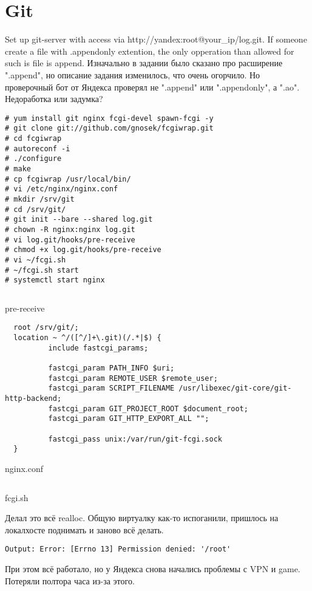 \documentclass[a4paper,10pt]{report}
\begin{document}
\chapter{Git}
Set up git-server with access via http://yandex:root@your\_ip/log.git.
\newline
If someone create a file with .appendonly extention, the only opperation than allowed for such is file is append.
\newline\newline
Изначально в задании было сказано про расширение ".append", но описание задания изменилось, что очень огорчило.
Но проверочный бот от Яндекса проверял не ".append" или ".appendonly", а ".ao". Недоработка или задумка?
\begin{verbatim}
# yum install git nginx fcgi-devel spawn-fcgi -y
# git clone git://github.com/gnosek/fcgiwrap.git
# cd fcgiwrap
# autoreconf -i
# ./configure
# make
# cp fcgiwrap /usr/local/bin/
# vi /etc/nginx/nginx.conf
# mkdir /srv/git
# cd /srv/git/
# git init --bare --shared log.git
# chown -R nginx:nginx log.git
# vi log.git/hooks/pre-receive
# chmod +x log.git/hooks/pre-receive
# vi ~/fcgi.sh
# ~/fcgi.sh start
# systemctl start nginx
\end{verbatim}
\begin{listing}[H]
  \inputminted[linenos=true, fontsize=\scriptsize, samepage=true]{bash}{pre-receive}
  \caption{pre-receive}
  \label{lst:pre-receive}

  \begin{verbatim}
  root /srv/git/;
  location ~ ^/([^/]+\.git)(/.*|$) {
          include fastcgi_params;

          fastcgi_param PATH_INFO $uri;
          fastcgi_param REMOTE_USER $remote_user;
          fastcgi_param SCRIPT_FILENAME /usr/libexec/git-core/git-http-backend;
          fastcgi_param GIT_PROJECT_ROOT $document_root;
          fastcgi_param GIT_HTTP_EXPORT_ALL "";

          fastcgi_pass unix:/var/run/git-fcgi.sock
  }
  \end{verbatim}
  \caption{nginx.conf}
  \label{lst:nginx.conf}
\end{listing}
\begin{listing}[H]
  \inputminted[linenos=true, fontsize=\tiny, samepage=true]{bash}{fcgi.sh}
  \caption{fcgi.sh}
  \label{lst:fcgi.sh}
\end{listing}
Делал это всё realloc. Общую виртуалку как-то испоганили, пришлось на локалхосте поднимать и заново всё делать.
\begin{verbatim}
Output: Error: [Errno 13] Permission denied: '/root'
\end{verbatim}
При этом всё работало, но у Яндекса снова начались проблемы с VPN и game. Потеряли полтора часа из-за этого.
\end{document}
